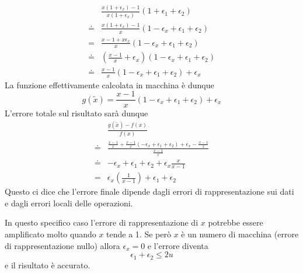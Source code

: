 \begin{example}
	\begin{align*}
		       & \frac{x (1 + \epsilon_x) - 1}{x (1 + \epsilon_x)} (1 + \epsilon_1 + \epsilon_2)        \\
		\doteq & \frac{x (1 + \epsilon_x) - 1}{x} (1 - \epsilon_x + \epsilon_1 + \epsilon_2)            \\
		=      & \frac{x - 1 + x \epsilon_x}{x} (1 - \epsilon_x + \epsilon_1 + \epsilon_2)              \\
		\doteq & \left( \frac{x - 1}{x} + \epsilon_x \right) (1 - \epsilon_x + \epsilon_1 + \epsilon_2) \\
		\doteq & \frac{x - 1}{x} (1 - \epsilon_x + \epsilon_1 + \epsilon_2) + \epsilon_x
	\end{align*}
	La funzione effettivamente calcolata in macchina è dunque
	\[ g(\tilde{x}) = \frac{x - 1}{x} (1 - \epsilon_x + \epsilon_1 + \epsilon_2) + \epsilon_x \]
	L'errore totale sul risultato sarà dunque
	\begin{align*}
		       & \frac{g(\tilde{x}) - f(x)}{f(x)}                                                            \\
		\doteq & \frac{\frac{x - 1}{x} + \frac{x-1}{x}(-\epsilon_x + \epsilon_1 + \epsilon_2) + \epsilon_x -
		\frac{x - 1}{x}}{\frac{x-1}{x}}                                                                      \\
		\doteq & -\epsilon_x + \epsilon_1 + \epsilon_2 + \epsilon_x \frac{x}{x - 1}                          \\
		=      & \epsilon_x \left( \frac{1}{x - 1} \right) + \epsilon_1 + \epsilon_2
	\end{align*}
	Questo ci dice che l'errore finale dipende dagli errori di rappresentazione sui dati e dagli errori locali
	delle operazioni.

	In questo specifico caso l'errore di rappresentazione di $x$ potrebbe essere amplificato molto quando $x$
	tende a 1. Se però $x$ è un numero di macchina (errore di rappresentazione nullo) allora $\epsilon_x = 0$
	e l'errore diventa
	\[ \epsilon_1 + \epsilon_2 \leq 2 u \]
	e il risultato è accurato.
\end{example}